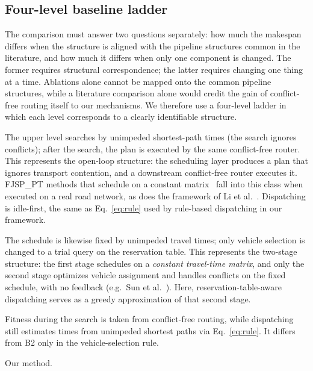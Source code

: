 \subsection{Four-level baseline ladder}
\label{sec:arms}

The comparison must answer two questions separately: how much the makespan differs when the structure is aligned with the pipeline structures common in the literature, and how much it differs when only one component is changed.
The former requires structural correspondence; the latter requires changing one thing at a time.
Ablations alone cannot be mapped onto the common pipeline structures, while a literature comparison alone would credit the gain of conflict-free routing itself to our mechanisms.
We therefore use a four-level ladder in which each level corresponds to a clearly identifiable structure.

\begin{description}[leftmargin=0pt,topsep=3pt,itemsep=3pt]
\item[B0: open-loop planning + realized execution.]
The upper level searches by unimpeded shortest-path times (the search ignores conflicts); after the search, the plan is executed by the same conflict-free router.
This represents the open-loop structure: the scheduling layer produces a plan that ignores transport contention, and a downstream conflict-free router executes it. FJSP\_PT methods that schedule on a constant matrix~\cite{meng2025cp,qin2026knowledge,fu2025integrated} fall into this class when executed on a real road network, as does the framework of Li et al.~\cite{li2026framework}. Dispatching is idle-first, the same as Eq.~\eqref{eq:rule} used by rule-based dispatching in our framework.
\item[B0+: open-loop planning + reservation-table-aware dispatching.]
The schedule is likewise fixed by unimpeded travel times; only vehicle selection is changed to a trial query on the reservation table.
This represents the two-stage structure: the first stage schedules on a \emph{constant travel-time matrix}, and only the second stage optimizes vehicle assignment and handles conflicts on the fixed schedule, with no feedback (e.g.\ Sun et al.~\cite{sun2023integrated}).
Here, reservation-table-aware dispatching serves as a greedy approximation of that second stage.
\item[B1: closed-loop planning + rule-based dispatching.]
Fitness during the search is taken from conflict-free routing, while dispatching still estimates times from unimpeded shortest paths via Eq.~\eqref{eq:rule}. It differs from B2 only in the vehicle-selection rule.
\item[B2: closed-loop planning + reservation-table-aware dispatching.]
Our method.
\end{description}

